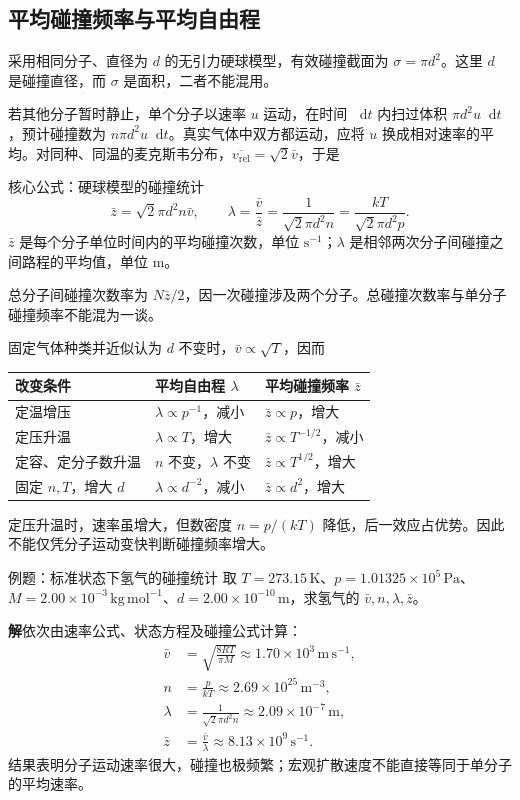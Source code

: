 \documentclass[UTF8,fontset=none,zihao=-4,a4paper]{ctexart}
\newcommand{\dd}{\mathop{}\!\mathrm{d}}
\newcommand{\unit}[1]{\,\mathrm{#1}}
\newcommand{\sol}{\par\noindent\textbf{解}\quad}
\begin{document}
\subsection{平均碰撞频率与平均自由程}
采用相同分子、直径为 $d$ 的无引力硬球模型，有效碰撞截面为 $\sigma=\pi d^2$。这里 $d$ 是碰撞直径，而 $\sigma$ 是面积，二者不能混用。

若其他分子暂时静止，单个分子以速率 $u$ 运动，在时间 $\dd t$ 内扫过体积 $\pi d^2u\dd t$，预计碰撞数为 $n\pi d^2u\dd t$。真实气体中双方都运动，应将 $u$ 换成相对速率的平均。对同种、同温的麦克斯韦分布，$\overline{v_{\mathrm{rel}}}=\sqrt2\bar v$，于是
\begin{infobox}{核心公式：硬球模型的碰撞统计}
\[
 \bar z=\sqrt2\pi d^2n\bar v,
 \qquad
 \lambda=\frac{\bar v}{\bar z}
 =\frac{1}{\sqrt2\pi d^2n}
 =\frac{kT}{\sqrt2\pi d^2p}.
\]
$\bar z$ 是每个分子单位时间内的平均碰撞次数，单位 $\mathrm{s^{-1}}$；$\lambda$ 是相邻两次分子间碰撞之间路程的平均值，单位 $\mathrm m$。
\end{infobox}
总分子间碰撞次数率为 $N\bar z/2$，因一次碰撞涉及两个分子。总碰撞次数率与单分子碰撞频率不能混为一谈。

固定气体种类并近似认为 $d$ 不变时，$\bar v\propto\sqrt T$，因而
\begin{center}
\begin{tabularx}{\linewidth}{l Y Y}
\toprule
改变条件 & 平均自由程 $\lambda$ & 平均碰撞频率 $\bar z$\\
\midrule
定温增压 & $\lambda\propto p^{-1}$，减小 & $\bar z\propto p$，增大\\
定压升温 & $\lambda\propto T$，增大 & $\bar z\propto T^{-1/2}$，减小\\
定容、定分子数升温 & $n$ 不变，$\lambda$ 不变 & $\bar z\propto T^{1/2}$，增大\\
固定 $n,T$，增大 $d$ & $\lambda\propto d^{-2}$，减小 & $\bar z\propto d^2$，增大\\
\bottomrule
\end{tabularx}
\end{center}
定压升温时，速率虽增大，但数密度 $n=p/(kT)$ 降低，后一效应占优势。因此不能仅凭分子运动变快判断碰撞频率增大。

\begin{infobox}{例题：标准状态下氢气的碰撞统计}
取 $T=273.15\unit K$、$p=1.01325\times10^5\unit{Pa}$、$M=2.00\times10^{-3}\unit{kg\,mol^{-1}}$、$d=2.00\times10^{-10}\unit m$，求氢气的 $\bar v,n,\lambda,\bar z$。
\end{infobox}
\sol 依次由速率公式、状态方程及碰撞公式计算：
\begin{align*}
 \bar v&=\sqrt{\frac{8RT}{\pi M}}\approx1.70\times10^3\unit{m\,s^{-1}},\\
 n&=\frac p{kT}\approx2.69\times10^{25}\unit{m^{-3}},\\
 \lambda&=\frac1{\sqrt2\pi d^2n}\approx2.09\times10^{-7}\unit m,\\
 \bar z&=\frac{\bar v}{\lambda}\approx8.13\times10^9\unit{s^{-1}}.
\end{align*}
结果表明分子运动速率很大，碰撞也极频繁；宏观扩散速度不能直接等同于单分子的平均速率。
\end{document}
